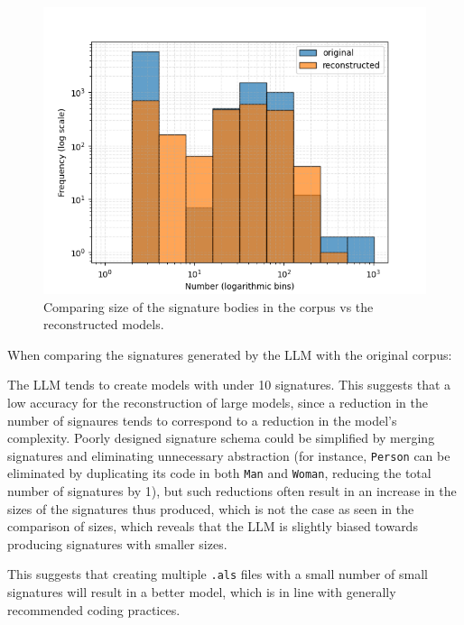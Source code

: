 \documentclass[conference]{IEEEtran}
\begin{document}
    
    \begin{figure}[htbp]
    \centerline{\includegraphics[width=\linewidth]{"./Comparing size of the signature bodies in the corpus vs the reconstructed models.png"}}
    \caption{Comparing size of the signature bodies in the corpus vs the reconstructed models.}
    \label{fig}
    \end{figure}

    When comparing the signatures generated by the LLM with the original corpus:

    The LLM tends to create models with under 10 signatures. This suggests that a low accuracy for the reconstruction of large models, since a reduction in the number of signaures tends to correspond to a reduction in the model's complexity. Poorly designed signature schema could be simplified by merging signatures and eliminating unnecessary abstraction (for instance, \verb|Person| can be eliminated by duplicating its code in both \verb|Man| and \verb|Woman|, reducing the total number of signatures by 1), but such reductions often result in an increase in the sizes of the signatures thus produced, which is not the case as seen in the comparison of sizes, which reveals that the LLM is slightly biased towards producing signatures with smaller sizes.
    
    This suggests that creating multiple \verb|.als| files with a small number of small signatures will result in a better model, which is in line with generally recommended coding practices.
\end{document}
